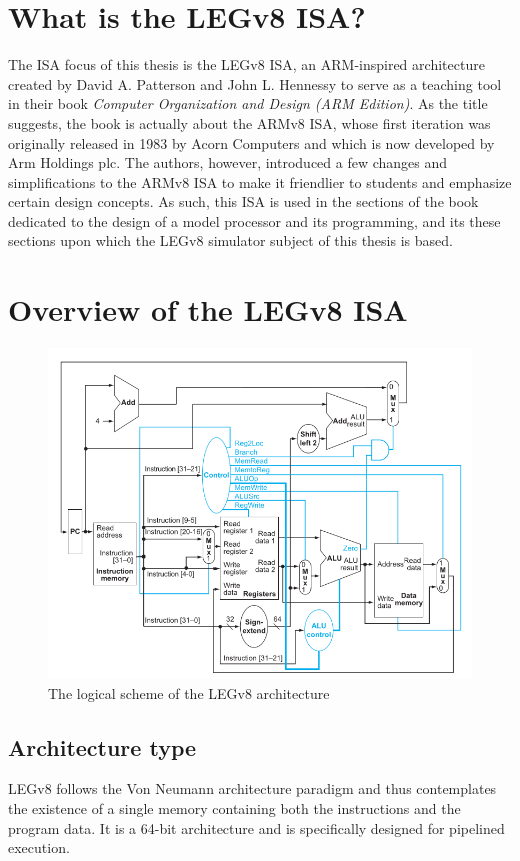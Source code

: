 \section*{What is the LEGv8 ISA?}

The ISA focus of this thesis is the LEGv8 ISA, an ARM-inspired architecture created by David A. Patterson and John L. Hennessy to serve as a teaching
tool in their book \emph{Computer Organization and Design (ARM Edition)}. As the title suggests, the book is actually about the ARMv8 ISA, whose first
iteration was originally released in 1983 by Acorn Computers and which is now developed by Arm Holdings plc. The authors, however, introduced a few
changes and simplifications to the ARMv8 ISA to make it friendlier to students and emphasize certain design concepts. As such, this ISA is used
in the sections of the book dedicated to the design of a model processor and its programming, and its these sections upon which the LEGv8 simulator
subject of this thesis is based.

\section*{Overview of the LEGv8 ISA}

\begin{figure}[H]
	\centering
	\includegraphics[width=.8\textwidth]{img/legv8_logical_scheme.png}
	\caption{The logical scheme of the LEGv8 architecture}
\end{figure}

\subsection*{Architecture type}
LEGv8 follows the Von Neumann architecture paradigm and thus contemplates the existence of a single memory containing both the instructions and the program data. It is a 64-bit architecture and is specifically designed for pipelined execution.
